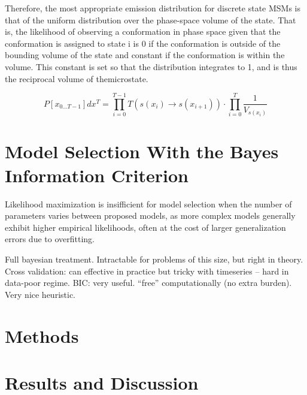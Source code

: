\documentclass[twocolumn,floatfix,nofootinbib,aps]{revtex4-1}
\begin{document}
Therefore, the most appropriate emission distribution for discrete state MSMs is that of the uniform distribution over the phase-space volume of the state. That is, the likelihood of observing a conformation in phase space given that the conformation is assigned to state i is 0 if the conformation is outside of the bounding volume of the state and constant if the conformation is within the volume. This constant is set so that the distribution integrates to 1, and is thus the reciprocal volume of themicrostate.

\begin{equation}
\label{eq:like_vol}
P[x_{0...T-1}] dx^T = \prod_{i=0}^{T-1} T(s(x_i) \rightarrow s(x_{i+1})) \cdot \prod_{i=0}^T \frac{1}{V_{s(x_{i})}}
\end{equation}

\section{Model Selection With the Bayes Information Criterion}

Likelihood maximization is insifficient for model selection when the number of parameters varies between proposed models, as more complex models generally exhibit higher empirical likelihoods, often at the cost of larger generalization errors due to overfitting.

Full bayesian treatment. Intractable for problems of this size, but right in theory. Cross validation: can effective in practice but tricky with timeseries -- hard in data-poor regime. BIC: very useful. ``free'' computationally (no extra burden). Very nice heuristic.


\section{Methods}

\section{Results and Discussion}
\end{document}
